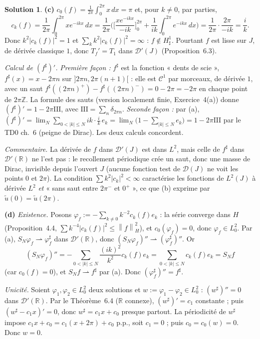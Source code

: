 \documentclass[11pt,a4paper]{article}
\newcommand{\R}{\mathbb{R}}
\newcommand{\Z}{\mathbb{Z}}
\newcommand{\norm}[1]{\left\|#1\right\|}
\newcommand{\wk}{\rightharpoonup}
\newcommand{\D}{\mathcal{D}}
\newcommand{\Sha}{\mathrm{III}}
\theoremstyle{definition}
\newtheorem*{solution}{Solution}
\begin{document}
\begin{solution}
\medskip
\noindent\textbf{(c)} $c_0(f)=\frac1{2\pi}\int_0^{2\pi}x\,dx=\pi$ et, pour $k\ne0$, par parties,
\[
c_k(f)=\frac1{2\pi}\int_0^{2\pi}xe^{-ikx}\,dx=\frac1{2\pi}\Big(\Big[\frac{xe^{-ikx}}{-ik}\Big]_0^{2\pi}+\frac1{ik}\int_0^{2\pi}e^{-ikx}\,dx\Big)=\frac1{2\pi}\cdot\frac{2\pi}{-ik}=\frac ik .
\]
Donc $k^2|c_k(f)|^2=1$ et $\sum_kk^2|c_k(f)|^2=\infty$ : $f\notin H^1_\sharp$. Pourtant $f$ est lisse sur $J$, de dérivée classique $1$, donc $T_f'=T_1$ dans $\D'(J)$ (Proposition~6.3).

\emph{Calcul de $(f^\sharp)'$.} \emph{Première façon :} $f^\sharp$ est la fonction « dents de scie », $f^\sharp(x)=x-2\pi n$ sur $]2\pi n,2\pi(n+1)[$ : elle est $\mathcal C^1$ par morceaux, de dérivée $1$, avec un saut $f^\sharp((2\pi n)^+)-f^\sharp((2\pi n)^-)=0-2\pi=-2\pi$ en chaque point de $2\pi\Z$. La formule des sauts (version localement finie, Exercice~4(a)) donne $(f^\sharp)'=1-2\pi\Sha$, avec $\Sha=\sum_n\delta_{2\pi n}$. \emph{Seconde façon :} par (a), $(f^\sharp)'=\lim_N\sum_{0<|k|\le N}ik\cdot\frac ik\,e_k=\lim_N\big(1-\sum_{|k|\le N}e_k\big)=1-2\pi\Sha$ par le TD0 ch.~6 (peigne de Dirac). Les deux calculs concordent.

\emph{Commentaire.} La dérivée de $f$ dans $\D'(J)$ est dans $L^2$, mais celle de $f^\sharp$ dans $\D'(\R)$ ne l'est pas : le recollement périodique crée un saut, donc une masse de Dirac, invisible depuis l'ouvert $J$ (aucune fonction test de $\D(J)$ ne voit les points $0$ et $2\pi$). La condition $\sum k^2|c_k|^2<\infty$ caractérise les fonctions de $L^2(J)$ à dérivée $L^2$ \emph{et} « sans saut entre $2\pi^-$ et $0^+$ », ce que (b) exprime par $\tilde u(0)=\tilde u(2\pi)$.

\medskip
\noindent\textbf{(d)} \emph{Existence.} Posons $\varphi_f:=-\sum_{k\ne0}k^{-2}c_k(f)e_k$ : la série converge dans $H$ (Proposition~4.4, $\sum k^{-4}|c_k(f)|^2\le\norm f_H^2$), et $c_0(\varphi_f)=0$, donc $\varphi_f\in L^2_0$. Par (a), $S_N\varphi_f\wk\varphi_f^\sharp$ dans $\D'(\R)$, donc $(S_N\varphi_f)''\wk(\varphi_f^\sharp)''$. Or
\[
(S_N\varphi_f)''=-\sum_{0<|k|\le N}\frac{(ik)^2}{k^2}c_k(f)e_k=\sum_{0<|k|\le N}c_k(f)e_k=S_Nf
\]
(car $c_0(f)=0$), et $S_Nf\wk f^\sharp$ par (a). Donc $(\varphi_f^\sharp)''=f^\sharp$.

\emph{Unicité.} Soient $\varphi_1,\varphi_2\in L^2_0$ deux solutions et $w:=\varphi_1-\varphi_2\in L^2_0$ : $(w^\sharp)''=0$ dans $\D'(\R)$. Par le Théorème~6.4 ($\R$ connexe), $(w^\sharp)'=c_1$ constante ; puis $(w^\sharp-c_1x)'=0$, donc $w^\sharp=c_1x+c_0$ presque partout. La périodicité de $w^\sharp$ impose $c_1x+c_0=c_1(x+2\pi)+c_0$ p.p., soit $c_1=0$ ; puis $c_0=c_0(w)=0$. Donc $w=0$.


\end{solution}
\end{document}
